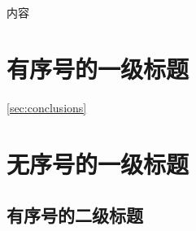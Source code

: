 \documentclass[UTF8]{article}
\author{cbs}
\date{} %
\begin{document}
  \maketittle
    内容
  \section{有序号的一级标题}
    \label{sec:system} %
  \ref{sec:conclusions}
  \section*{无序号的一级标题}
  \subsection{有序号的二级标题}
\end{document}
